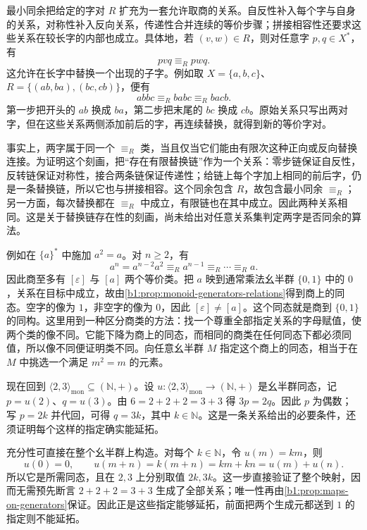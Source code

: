 最小同余把给定的字对 \(R\) 扩充为一套允许取商的关系。自反性补入每个字与自身的关系，对称性补入反向关系，传递性合并连续的等价步骤；拼接相容性还要求这些关系在较长字的内部也成立。具体地，若 \((v,w)\in R\)，则对任意字 \(p,q\in X^*\)，有
\[
	pvq\equiv_R pwq.
\]
这允许在长字中替换一个出现的子字。例如取 \(X=\{a,b,c\}\)、\(R=\{(ab,ba),(bc,cb)\}\)，便有
\[
	abbc\equiv_R babc\equiv_R bacb.
\]
第一步把开头的 \(ab\) 换成 \(ba\)，第二步把末尾的 \(bc\) 换成 \(cb\)。原始关系只写出两对字，但在这些关系两侧添加前后的字，再连续替换，就得到新的等价字对。

\ProseParagraphBreak
事实上，两字属于同一个 \(\equiv_R\) 类，当且仅当它们能由有限次这种正向或反向替换连接。为证明这个刻画，把“存在有限替换链”作为一个关系：零步链保证自反性，反转链保证对称性，接合两条链保证传递性；给链上每个字加上相同的前后字，仍是一条替换链，所以它也与拼接相容。这个同余包含 \(R\)，故包含最小同余 \(\equiv_R\)；另一方面，每次替换都在 \(\equiv_R\) 中成立，有限链也在其中成立。因此两种关系相同。这是关于替换链存在性的刻画，尚未给出对任意关系集判定两字是否同余的算法。

\ProseParagraphBreak
例如在 \(\{a\}^*\) 中施加 \(a^2=a\)。对 \(n\geq2\)，有
\[
	a^n=a^{n-2}a^2\equiv_R a^{n-1}\equiv_R\cdots\equiv_R a.
\]
因此商至多有 \([\varepsilon]\) 与 \([a]\) 两个等价类。把 \(a\) 映到通常乘法幺半群 \(\{0,1\}\) 中的 \(0\)，关系在目标中成立，故由\cref{b1:prop:monoid-generators-relations}得到商上的同态。空字的像为 \(1\)，非空字的像为 \(0\)，因此 \([\varepsilon]\neq[a]\)。这个同态就是商到 \(\{0,1\}\) 的同构。这里用到一种区分商类的方法：找一个尊重全部指定关系的字母赋值，使两个类的像不同。它能下降为商上的同态，而相同的商类在任何同态下都必须同值，所以像不同便证明类不同。向任意幺半群 \(M\) 指定这个商上的同态，相当于在 \(M\) 中挑选一个满足 \(m^2=m\) 的元素。

\ProseParagraphBreak
现在回到 \(\langle2,3\rangle_{\mathrm{mon}}\subseteq(\mathbb N,+)\)。设 \(u:\langle2,3\rangle_{\mathrm{mon}}\rightarrow(\mathbb N,+)\) 是幺半群同态，记 \(p=u(2)\)、\(q=u(3)\)。由 \(6=2+2+2=3+3\) 得 \(3p=2q\)。因此 \(p\) 为偶数；写 \(p=2k\) 并代回，可得 \(q=3k\)，其中 \(k\in\mathbb N\)。这是一条关系给出的必要条件，还须证明每个这样的指定确实能延拓。

\ProseParagraphBreak
充分性可直接在整个幺半群上构造。对每个 \(k\in\mathbb N\)，令 \(u(m)=km\)，则
\[
	u(0)=0,\qquad u(m+n)=k(m+n)=km+kn=u(m)+u(n).
\]
所以它是所需同态，且在 \(2,3\) 上分别取值 \(2k,3k\)。这一步直接验证了整个映射，因而无需预先断言 \(2+2+2=3+3\) 生成了全部关系；唯一性再由\cref{b1:prop:maps-on-generators}保证。因此正是这些指定能够延拓，前面把两个生成元都送到 \(1\) 的指定则不能延拓。

